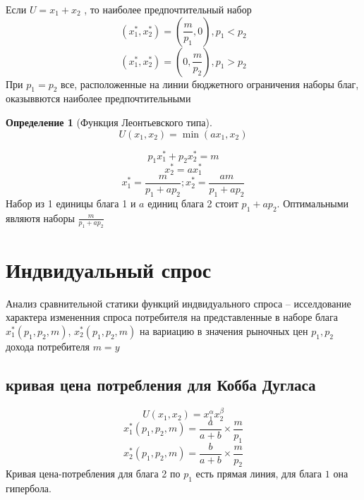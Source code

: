 \documentclass[14pt]{extarticle}
\newtheorem{definition}{Определение}
\begin{document}
 Если $U = x_1 + x_2$ , то наиболее предпочтительный набор
 \begin{equation}
	 (x_1^{*} ,x_2^{*}) = \left(\frac{m}{p_1},0\right), p_1<p_2
 \end{equation} 
 \begin{equation}
	 (x_1^{*},x_2^{*}) = \left(0,\frac{m}{p_2}\right), p_1 > p_2
 \end{equation} 
 При $p_1 = p_2$ все, расположенные на линии бюджетного
 ограничения наборы благ, оказыввются наиболее предпочтительными
 \begin{definition}[Функция Леонтьевского типа]
	 \begin{equation}
	 U(x_1,x_2) =  \min(ax_1,x_2)
	 \end{equation} 
 \end{definition}
 \begin{equation}
 p_1 x_1^{*}  + p_2 x_2^{*} = m
 \end{equation} 
 \begin{equation}
 x_2^{*} =  a x_1^{*}
 \end{equation} 
 \begin{equation}
 x_1^{*}  = \frac{m}{p_1 + a p_2} ; x_2^{*} = \frac{am}{p_1 + ap_2}
 \end{equation} 
 Набор из 1 единицы блага 1 и $a$ единиц блага 2 стоит  $p_1 + a p_2$. Оптимальными являютя наборы $\frac{m}{p_1 + a p_2}$
 \section{Индвидуальный спрос}
 Анализ сравнительной статики функций индвидуального спроса --
 исселдование характера измененния спроса потребителя
 на представленные в наборе блага
 $x_1^{*}(p_1,p_2,m)$, $x_2^{*}(p_1,p_2,m)$ на вариацию в значения рыночных цен $p_1,p_2$ дохода потребителя $m = y$
 \subsection{кривая цена потребления для Кобба Дугласа}
 \begin{equation}
 U(x_1,x_2) = x_1^{\alpha} x_2^{\beta}
 \end{equation} 
 \begin{equation}
 x_1^{*} (p_1,p_2,m) = \frac{a}{a+b} \times \frac{m}{p_1}
 \end{equation} 
 \begin{equation}
 x_2^{*} (p_1,p_2,m) = \frac{b}{a+b} \times \frac{m}{p_2}
 \end{equation} 
 Кривая цена-потребления для блага 2 по  $p_1$ есть прямая линия,
 для блага $1$ она гипербола.
\end{document}
